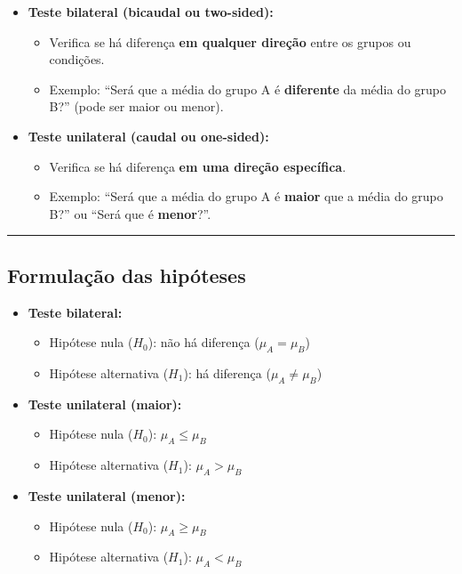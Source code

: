 \documentclass[
]{book}
\providecommand{\tightlist}{%
  \setlength{\itemsep}{0pt}\setlength{\parskip}{0pt}}
\begin{document}
\begin{itemize}
\tightlist
\item
  \textbf{Teste bilateral (bicaudal ou two-sided):}

  \begin{itemize}
  \tightlist
  \item
    Verifica se há diferença \textbf{em qualquer direção} entre os grupos ou condições.
  \item
    Exemplo: ``Será que a média do grupo A é \textbf{diferente} da média do grupo B?'' (pode ser maior ou menor).
  \end{itemize}
\item
  \textbf{Teste unilateral (caudal ou one-sided):}

  \begin{itemize}
  \tightlist
  \item
    Verifica se há diferença \textbf{em uma direção específica}.
  \item
    Exemplo: ``Será que a média do grupo A é \textbf{maior} que a média do grupo B?'' ou ``Será que é \textbf{menor}?''.
  \end{itemize}
\end{itemize}

\begin{center}\rule{0.5\linewidth}{0.5pt}\end{center}

\subsection{Formulação das hipóteses}\label{formulauxe7uxe3o-das-hipuxf3teses}

\begin{itemize}
\tightlist
\item
  \textbf{Teste bilateral:}

  \begin{itemize}
  \tightlist
  \item
    Hipótese nula (\(H_0\)): não há diferença (\(\mu_A = \mu_B\))
  \item
    Hipótese alternativa (\(H_1\)): há diferença (\(\mu_A \neq \mu_B\))
  \end{itemize}
\item
  \textbf{Teste unilateral (maior):}

  \begin{itemize}
  \tightlist
  \item
    Hipótese nula (\(H_0\)): \(\mu_A \leq \mu_B\)
  \item
    Hipótese alternativa (\(H_1\)): \(\mu_A > \mu_B\)
  \end{itemize}
\item
  \textbf{Teste unilateral (menor):}

  \begin{itemize}
  \tightlist
  \item
    Hipótese nula (\(H_0\)): \(\mu_A \geq \mu_B\)
  \item
    Hipótese alternativa (\(H_1\)): \(\mu_A < \mu_B\)
  \end{itemize}
\end{itemize}
\end{document}
